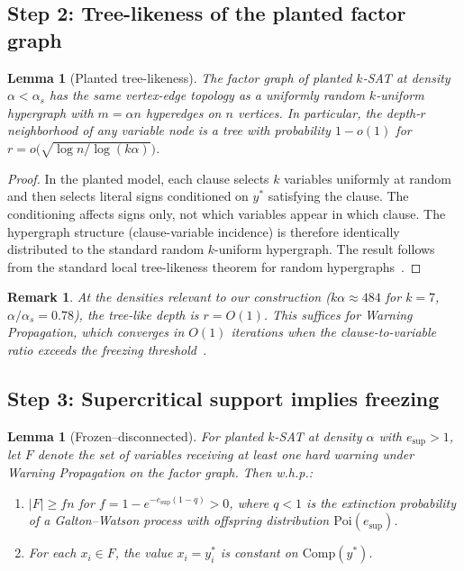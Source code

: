 \documentclass[11pt]{article}
\newtheorem{lemma}[theorem]{Lemma}
\newtheorem{remark}[theorem]{Remark}
\begin{document}
\subsection{Step 2: Tree-likeness of the planted factor graph}

\begin{lemma}[Planted tree-likeness]\label{lem:tree}
The factor graph of planted $k$-SAT at density $\alpha < \alpha_s$ has the same vertex-edge topology as a uniformly random $k$-uniform hypergraph with $m = \alpha n$ hyperedges on $n$ vertices.  In particular, the depth-$r$ neighborhood of any variable node is a tree with probability $1 - o(1)$ for $r = o\bigl(\sqrt{\log n / \log(k\alpha)}\bigr)$.
\end{lemma}

\begin{proof}
In the planted model, each clause selects $k$ variables uniformly at random and then selects literal signs conditioned on $y^*$ satisfying the clause.  The conditioning affects signs only, not which variables appear in which clause.  The hypergraph structure (clause-variable incidence) is therefore identically distributed to the standard random $k$-uniform hypergraph.  The result follows from the standard local tree-likeness theorem for random hypergraphs~\cite{DM10,MR95}.
\end{proof}

\begin{remark}
At the densities relevant to our construction ($k\alpha \approx 484$ for $k = 7$, $\alpha/\alpha_s = 0.78$), the tree-like depth is $r = O(1)$.  This suffices for Warning Propagation, which converges in $O(1)$ iterations when the clause-to-variable ratio exceeds the freezing threshold~\cite{CZ12}.
\end{remark}


\subsection{Step 3: Supercritical support implies freezing}

\begin{lemma}[Frozen--disconnected]\label{lem:frozen}
For planted $k$-SAT at density $\alpha$ with $e_{\mathrm{sup}} > 1$, let $F$ denote the set of variables receiving at least one hard warning under Warning Propagation on the factor graph.  Then w.h.p.:
\begin{enumerate}[label=(\alph*)]
\item $|F| \geq fn$ for $f = 1 - e^{-e_{\mathrm{sup}}(1-q)} > 0$, where $q < 1$ is the extinction probability of a Galton--Watson process with offspring distribution $\mathrm{Poi}(e_{\mathrm{sup}})$.
\item For each $x_i \in F$, the value $x_i = y^*_i$ is constant on $\mathrm{Comp}(y^*)$.
\end{enumerate}
\end{lemma}
\end{document}
